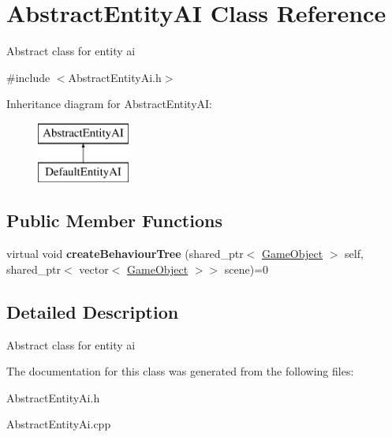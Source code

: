 \hypertarget{class_abstract_entity_a_i}{}\section{Abstract\+Entity\+AI Class Reference}
\label{class_abstract_entity_a_i}


Abstract class for entity ai  




{\ttfamily \#include $<$Abstract\+Entity\+Ai.\+h$>$}

Inheritance diagram for Abstract\+Entity\+AI\+:\begin{figure}[H]
\begin{center}
\leavevmode
\includegraphics[height=2.000000cm]{class_abstract_entity_a_i}
\end{center}
\end{figure}
\subsection*{Public Member Functions}
\begin{DoxyCompactItemize}
\item 
\mbox{\label{class_abstract_entity_a_i_a8dd5f0ed0b97b8089b1e0a7e67754bff}} 
virtual void {\bfseries create\+Behaviour\+Tree} (shared\+\_\+ptr$<$ \mbox{\hyperlink{class_game_object}{Game\+Object}} $>$ self, shared\+\_\+ptr$<$ vector$<$ \mbox{\hyperlink{class_game_object}{Game\+Object}} $>$$>$ scene)=0
\end{DoxyCompactItemize}


\subsection{Detailed Description}
Abstract class for entity ai 



The documentation for this class was generated from the following files\+:\begin{DoxyCompactItemize}
\item 
Abstract\+Entity\+Ai.\+h\item 
Abstract\+Entity\+Ai.\+cpp\end{DoxyCompactItemize}
